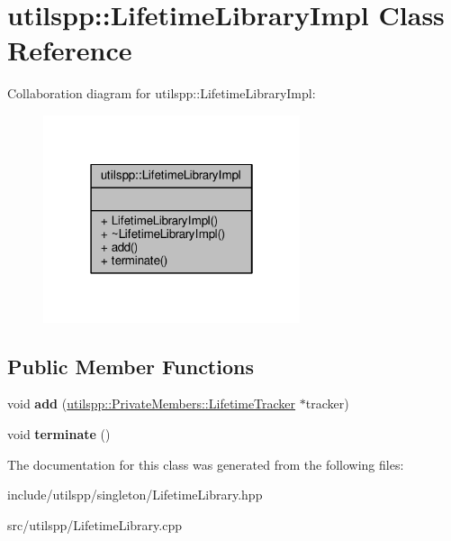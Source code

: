 \hypertarget{classutilspp_1_1LifetimeLibraryImpl}{\section{utilspp\-:\-:Lifetime\-Library\-Impl Class Reference}
\label{classutilspp_1_1LifetimeLibraryImpl}
}


Collaboration diagram for utilspp\-:\-:Lifetime\-Library\-Impl\-:
\nopagebreak
\begin{figure}[H]
\begin{center}
\leavevmode
\includegraphics[width=214pt]{classutilspp_1_1LifetimeLibraryImpl__coll__graph}
\end{center}
\end{figure}
\subsection*{Public Member Functions}
\begin{DoxyCompactItemize}
\item 
\hypertarget{classutilspp_1_1LifetimeLibraryImpl_a624b36a3c2929a414ed61950681408dc}{void {\bfseries add} (\hyperlink{classutilspp_1_1PrivateMembers_1_1LifetimeTracker}{utilspp\-::\-Private\-Members\-::\-Lifetime\-Tracker} $\ast$tracker)}\label{classutilspp_1_1LifetimeLibraryImpl_a624b36a3c2929a414ed61950681408dc}

\item 
\hypertarget{classutilspp_1_1LifetimeLibraryImpl_af4335b572c6c3369049e68f4d9612267}{void {\bfseries terminate} ()}\label{classutilspp_1_1LifetimeLibraryImpl_af4335b572c6c3369049e68f4d9612267}

\end{DoxyCompactItemize}


The documentation for this class was generated from the following files\-:\begin{DoxyCompactItemize}
\item 
include/utilspp/singleton/Lifetime\-Library.\-hpp\item 
src/utilspp/Lifetime\-Library.\-cpp\end{DoxyCompactItemize}
